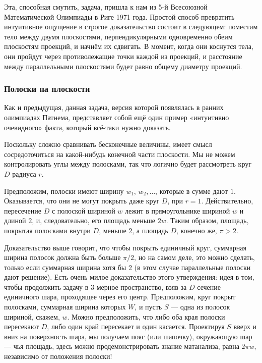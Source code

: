 Эта, способная смутить, задача, пришла к нам из 5-й Всесоюзной Математической Олимпиады в Риге 1971 года.
Простой способ превратить интуитивное ощущение в строгое доказательство состоит в следующем: поместим тело между двумя плоскостями, перпендикулярными одновременно обеим плоскостям проекций, и начнём их сдвигать.
В  момент, когда они коснутся тела, они пройдут через противолежащие точки каждой из проекций, и расстояние между параллельными плоскостями будет равно общему диаметру проекций.
\heart

\subsubsection*{Полоски на плоскости}%

Как и предыдущая, данная задача, версия которой появлялась в ранних олимпиадах Патнема, представляет собой ещё один пример «интуитивно очевидного» факта, который всё-таки нужно доказать.

\medskip

Поскольку сложно сравнивать бесконечные величины, имеет смысл сосредоточиться на какой-нибудь конечной части плоскости.
Мы не можем контролировать углы между полосками, так что логично будет рассмотреть круг $D$ радиуса $r$.

Предположим, полоски имеют ширину $w_1$, $w_2,\dots$, которые в сумме дают $1$.
Оказывается, что они не могут покрыть даже круг $D$, при $r=1$.
Действительно, пересечение $D$ с полоской шириной $w$ лежит в прямоугольнике шириной $w$ и длиной $2$, и, следовательно, его площадь меньше $2w$.
Таким образом, площадь, покрытая полосками внутри $D$, меньше $2$, а площадь $D$, конечно же, $\pi>2$.
\heart 

Доказательство выше говорит, что чтобы покрыть единичный круг, суммарная ширина полосок должна быть больше $\pi/2$, но на самом деле, это можно сделать, только если суммарная ширина хотя бы 2 (в этом случае параллельные полоски дают решение).
Есть очень милое доказательство этого утверждения:
идея в том, чтобы продолжить задачу в 3-мерное пространство, взяв за $D$ сечение единичного шара, проходящее через его центр.
Предположим, круг покрыт полосками, суммарная ширина которых $W$, и пусть $S$ --- одна из полосок шириной, скажем, $w$.
Можно предположить, что либо оба края полоски пересекают $D$, либо один край пересекает и один касается.
Проектируя $S$ вверх и вниз на поверхность шара, мы получаем пояс (или шапочку),
окружающую шар --- чья площадь, здесь можно продемонстрировать знание матанализа, равна 
$2\pi w$, независимо от положения полоски!

